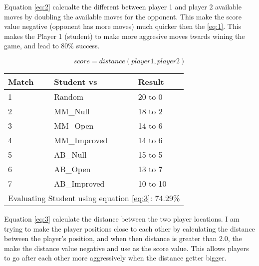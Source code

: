 \documentclass{article}
\begin{document}
Equation \ref{eq:2} calcualte the different between player 1 and player 2 available moves by doubling the available moves for the opponent. This make the score value negative (opponent has more moves) much quicker then the \ref{eq:1}. This makes the Player 1 (student) to make more aggresive moves twards wining the game, and lead to $80\%$ success.


\begin{equation}
score = distance(player1, player2)
\label{eq:3}
\end{equation}

\begin{center}
\begin{tabular}{|l|l|l|} \hline
	Match & Student vs & Result \\ \hline
	1 & Random & 20 to 0\\
	2 & MM\_Null & 18 to 2\\
	3 & MM\_Open & 14 to 6\\
	4 & MM\_Improved & 14 to 6\\
	5 & AB\_Null & 15 to 5\\
	6 & AB\_Open & 13 to 7\\
	7 & AB\_Improved & 10 to 10\\ \hline\hline
	\multicolumn{3}{|l|}{Evaluating Student using equation \ref{eq:3}: 74.29\% } \\ \hline
\end{tabular}
\end{center}

Equation \ref{eq:3} calculate the distance between the two player locations. I am trying to make the player positions close to each other by calculating the distance between the player's position, and when then distance is greater than $2.0$, the make the distance value negative and use as the score value. This allows players to go after each other more aggressively when the distance getter bigger.
\end{document}
